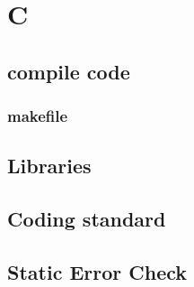 \chapter{C} 

\section{compile code} 

\subsection{makefile} 

\section{Libraries} 

\section{Coding standard} 

\section{Static Error Check} 
